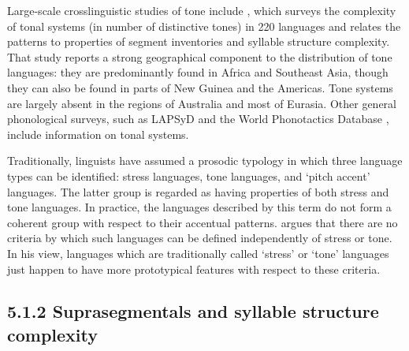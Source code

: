   Large-scale crosslinguistic studies of tone include \citet{Maddieson2013d}, which surveys the complexity of tonal systems (in number of distinctive tones) in 220 languages and relates the patterns to properties of segment inventories and syllable structure complexity. That study reports a strong geographical component to the distribution of tone languages: they are predominantly found in Africa and Southeast Asia, though they can also be found in parts of New Guinea and the Americas. Tone systems are largely absent in the regions of Australia and most of Eurasia. Other general phonological surveys, such as LAPSyD \citep{MaddiesonEtAl2013} and the World Phonotactics Database \citep{DonohueEtAl2013}, include information on tonal systems.



  Traditionally, linguists have assumed a prosodic typology in which three language types can be identified: stress languages, tone languages, and ‘pitch accent’ languages. The latter group is regarded as having properties of both stress and tone languages. In practice, the languages described by this term do not form a coherent group with respect to their accentual patterns. \citet{Hyman2009} argues that there are no criteria by which such languages can be defined independently of stress or tone. In his view, languages which are traditionally called ‘stress’ or ‘tone’ languages just happen to have more prototypical features with respect to these criteria.


\subsection{5.1.2 Suprasegmentals and syllable structure complexity}

